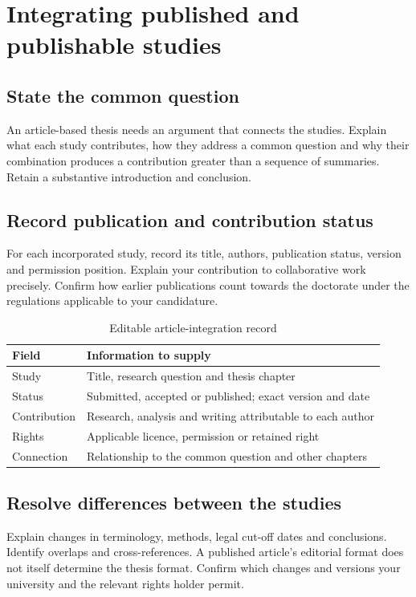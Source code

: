 \chapter{Integrating published and publishable studies}\label{ch:article-integration}
\section{State the common question}
An article-based thesis needs an argument that connects the studies. Explain
what each study contributes, how they address a common question and why their
combination produces a contribution greater than a sequence of summaries.
Retain a substantive introduction and conclusion.

\section{Record publication and contribution status}
For each incorporated study, record its title, authors, publication status,
version and permission position. Explain your contribution to collaborative
work precisely. Confirm how earlier publications count towards the doctorate
under the regulations applicable to your candidature.

\begin{table}[htbp]
\centering\small
\caption{Editable article-integration record}\label{tab:articles}
\begin{tabularx}{\textwidth}{@{}p{}X@{}}
\toprule
Field & Information to supply \\
\midrule
Study & Title, research question and thesis chapter \\
Status & Submitted, accepted or published; exact version and date \\
Contribution & Research, analysis and writing attributable to each author \\
Rights & Applicable licence, permission or retained right \\
Connection & Relationship to the common question and other chapters \\
\bottomrule
\end{tabularx}
\end{table}

\section{Resolve differences between the studies}
Explain changes in terminology, methods, legal cut-off dates and conclusions.
Identify overlaps and cross-references. A published article's editorial format
does not itself determine the thesis format. Confirm which changes and versions
your university and the relevant rights holder permit.

